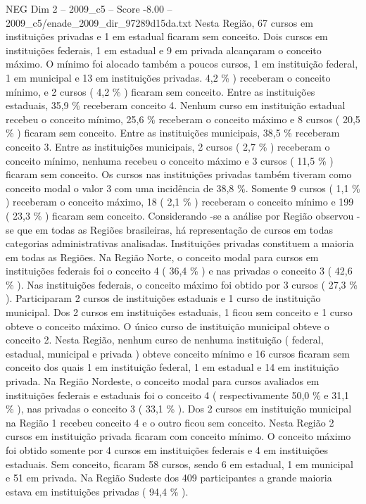 \begin{textsample}{NEG Dim 2 – 2009\_c5 – Score -8.00 – 2009\_c5/enade\_2009\_dir\_97289d15da.txt}
Nesta Região, 67 cursos em instituições privadas e 1 em estadual ficaram sem conceito.
Dois cursos em instituições federais, 1 em estadual e 9 em privada alcançaram o conceito máximo.
O mínimo foi alocado também a poucos cursos, 1 em instituição federal, 1 em municipal e 13 em instituições privadas. 4,2 \% ) receberam o conceito mínimo, e 2 cursos ( 4,2 \% ) ficaram sem conceito.
Entre as instituições estaduais, 35,9 \% receberam conceito 4.
Nenhum curso em instituição estadual recebeu o conceito mínimo, 25,6 \% receberam o conceito máximo e 8 cursos ( 20,5 \% ) ficaram sem conceito.
Entre as instituições municipais, 38,5 \% receberam conceito 3.
Entre as instituições municipais, 2 cursos ( 2,7 \% ) receberam o conceito mínimo, nenhuma recebeu o conceito máximo e 3 cursos ( 11,5 \% ) ficaram sem conceito.
Os cursos nas instituições privadas também tiveram como conceito modal o valor 3 com uma incidência de 38,8 \%.
Somente 9 cursos ( 1,1 \% ) receberam o conceito máximo, 18 ( 2,1 \% ) receberam o conceito mínimo e 199 ( 23,3 \% ) ficaram sem conceito.
Considerando -se a análise por Região observou -se que em todas as Regiões brasileiras, há representação de cursos em todas categorias administrativas analisadas.
Instituições privadas constituem a maioria em todas as Regiões.
Na Região Norte, o conceito modal para cursos em instituições federais foi o conceito 4 ( 36,4 \% ) e nas privadas o conceito 3 ( 42,6 \% ).
Nas instituições federais, o conceito máximo foi obtido por 3 cursos ( 27,3 \% ).
Participaram 2 cursos de instituições estaduais e 1 curso de instituição municipal.
Dos 2 cursos em instituições estaduais, 1 ficou sem conceito e 1 curso obteve o conceito máximo.
O único curso de instituição municipal obteve o conceito 2.
Nesta Região, nenhum curso de nenhuma instituição ( federal, estadual, municipal e privada ) obteve conceito mínimo e 16 cursos ficaram sem conceito dos quais 1 em instituição federal, 1 em estadual e 14 em instituição privada.
Na Região Nordeste, o conceito modal para cursos avaliados em instituições federais e estaduais foi o conceito 4 ( respectivamente 50,0 \% e 31,1 \% ), nas privadas o conceito 3 ( 33,1 \% ).
Dos 2 cursos em instituição municipal na Região 1 recebeu conceito 4 e o outro ficou sem conceito.
Nesta Região 2 cursos em instituição privada ficaram com conceito mínimo.
O conceito máximo foi obtido somente por 4 cursos em instituições federais e 4 em instituições estaduais.
Sem conceito, ficaram 58 cursos, sendo 6 em estadual, 1 em municipal e 51 em privada.
Na Região Sudeste dos 409 participantes a grande maioria estava em instituições privadas ( 94,4 \% ).

\end{textsample}
